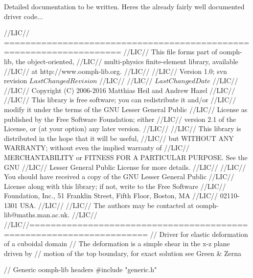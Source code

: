 Detailed documentation to be written. Here\textquotesingle{}s the already fairly well documented driver code...


\begin{DoxyCodeInclude}
\textcolor{comment}{//LIC// ====================================================================}
\textcolor{comment}{//LIC// This file forms part of oomph-lib, the object-oriented, }
\textcolor{comment}{//LIC// multi-physics finite-element library, available }
\textcolor{comment}{//LIC// at http://www.oomph-lib.org.}
\textcolor{comment}{//LIC// }
\textcolor{comment}{//LIC//    Version 1.0; svn revision $LastChangedRevision$}
\textcolor{comment}{//LIC//}
\textcolor{comment}{//LIC// $LastChangedDate$}
\textcolor{comment}{//LIC// }
\textcolor{comment}{//LIC// Copyright (C) 2006-2016 Matthias Heil and Andrew Hazel}
\textcolor{comment}{//LIC// }
\textcolor{comment}{//LIC// This library is free software; you can redistribute it and/or}
\textcolor{comment}{//LIC// modify it under the terms of the GNU Lesser General Public}
\textcolor{comment}{//LIC// License as published by the Free Software Foundation; either}
\textcolor{comment}{//LIC// version 2.1 of the License, or (at your option) any later version.}
\textcolor{comment}{//LIC// }
\textcolor{comment}{//LIC// This library is distributed in the hope that it will be useful,}
\textcolor{comment}{//LIC// but WITHOUT ANY WARRANTY; without even the implied warranty of}
\textcolor{comment}{//LIC// MERCHANTABILITY or FITNESS FOR A PARTICULAR PURPOSE.  See the GNU}
\textcolor{comment}{//LIC// Lesser General Public License for more details.}
\textcolor{comment}{//LIC// }
\textcolor{comment}{//LIC// You should have received a copy of the GNU Lesser General Public}
\textcolor{comment}{//LIC// License along with this library; if not, write to the Free Software}
\textcolor{comment}{//LIC// Foundation, Inc., 51 Franklin Street, Fifth Floor, Boston, MA}
\textcolor{comment}{//LIC// 02110-1301  USA.}
\textcolor{comment}{//LIC// }
\textcolor{comment}{//LIC// The authors may be contacted at oomph-lib@maths.man.ac.uk.}
\textcolor{comment}{//LIC// }
\textcolor{comment}{//LIC//====================================================================}
\textcolor{comment}{// Driver for elastic deformation of a cuboidal domain}
\textcolor{comment}{// The deformation is a simple shear in the x-z plane driven by}
\textcolor{comment}{// motion of the top boundary, for exact solution see Green & Zerna}
 
\textcolor{comment}{// Generic oomph-lib headers}
\textcolor{preprocessor}{#include "generic.h"}


\end{DoxyCodeInclude}
